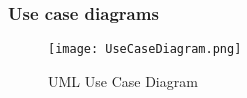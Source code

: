 \subsubsection{Use case diagrams}

\begin{figure}[ht!]
\centering
\texttt{[image: UseCaseDiagram.png]}
\caption{UML Use Case Diagram \label{overflow}}
\end{figure}

\pagebreak